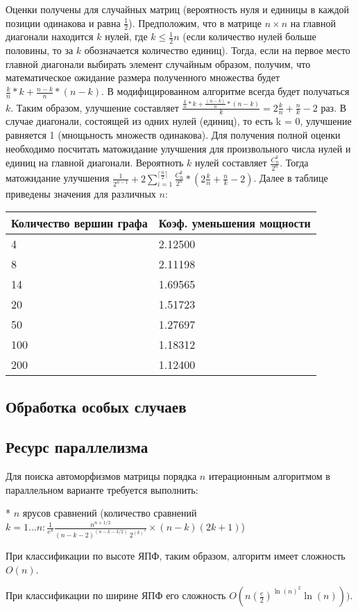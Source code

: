Оценки получены для случайных матриц (вероятность нуля и единицы в каждой позиции
одинакова и равна $\frac{1}{2}$).
Предположим, что в матрице $n\times n$ на главной диагонали находится $k$ нулей, где $k \leq \frac{1}{2} n$ (если количество нулей больше половины, то за $k$ обозначается количество единиц).
Тогда, если на первое место главной диагонали выбирать элемент случайным образом,
получим, что математическое ожидание размера полученного множества будет $\frac{k}{n}*k + \frac{n-k}{n}*(n-k)$.
В модифицированном алгоритме всегда будет получаться $k$. Таким образом,
улучшение составляет $\frac{\frac{k}{n} * k + \frac{(n-k)}{n} * (n-k)} {k} = 2 \frac{k}{n} + \frac{n}{k} - 2$ раз. В случае диагонали,
состоящей из одних нулей (единиц), то есть k = 0, улучшение равняется 1 (мнощьность
множеств одинакова).
Для получения полной оценки необходимо посчитать матожидание улучшения для
произвольного числа нулей и единиц на главной диагонали. Вероятноть $k$ нулей
составляет $\frac{C_n^k}{2^n}$. Тогда матожидание улучшения $\frac{1}{2^{n-1}} + 2 \sum\limits_{i=1}^{\lceil\frac{n}{2}\rceil} \frac{C_n^k}{2^n} * (2\frac{k}{n} + \frac{n}{k} - 2)$.
Далее в таблице приведены значения для различных $n$:

\begin{tabular}[t]{||l|l||}
\hline
Количество вершин графа & Коэф. уменьшения мощности \\
\hline
4 &  2.12500 \\
\hline
8 & 2.11198 \\
\hline
14 & 1.69565 \\
\hline
20 & 1.51723 \\
\hline
50 & 1.27697 \\
\hline
100 & 1.18312 \\
\hline
200 & 1.12400 \\
\hline
\end{tabular}

\subsection{Обработка особых случаев}


\subsection{Ресурс параллелизма}
Для поиска автоморфизмов матрицы порядка $n$ итерационным алгоритмом в параллельном варианте требуется выполнить:

* $n$ ярусов сравнений (количество сравнений $ k = 1 \ldots n: \frac{1}{e^{k}} \frac{n^{n+1/2}}{(n-k-2)^{(n-k-3/2)}~2^{(k)^2}} \times (n - k)(2k + 1) $)

При классификации по высоте ЯПФ, таким образом, алгоритм имеет сложность $ O(n) $.

При классификации по ширине ЯПФ его сложность $ O(n(\frac{e}{2})^{\ln(n)^2} \ln(n))) $.
